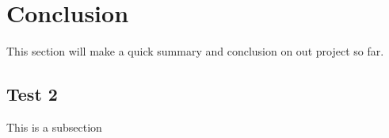 \documentclass[a4paper,11pt]{article}
\begin{document}
\pagebreak
\section{Conclusion} %
\label{sec:Conclusion}
This section will make a quick summary and conclusion on out project so far.

\subsection{Test 2}

This is a subsection
\end{document}
